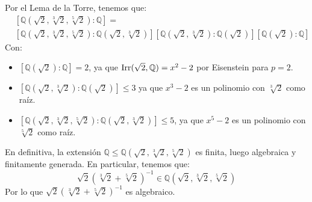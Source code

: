 \begin{ejercicio}
\begin{itemize}
            Por el Lema de la Torre, tenemos que:
            \begin{align*}
                &\left[\mathbb{Q}\left(\sqrt{2},\sqrt[3]{2},\sqrt[5]{2}\right):\mathbb{Q}\right] =
             \\ &\left[\mathbb{Q}\left(\sqrt{2},\sqrt[3]{2},\sqrt[5]{2}\right):\mathbb{Q}\left(\sqrt{2},\sqrt[3]{2}\right)\right] \left[\mathbb{Q}\left(\sqrt{2},\sqrt[3]{2}\right):\mathbb{Q}(\sqrt{2})\right] \left[\mathbb{Q}\left(\sqrt{2}\right):\mathbb{Q}\right]
            \end{align*}
            Con:
            \begin{itemize}
                \item $\left[\mathbb{Q}\left(\sqrt{2}\right):\mathbb{Q}\right] = 2$, ya que $\operatorname{Irr}(\sqrt{2},\mathbb{Q}) = x^2-2$ por Eisenstein para $p=2$.
                \item $\left[\mathbb{Q}\left(\sqrt{2},\sqrt[3]{2}\right):\mathbb{Q}\left(\sqrt{2}\right)\right]\leq 3$ ya que $x^3-2$ es un polinomio con $\sqrt[3]{2}$ como raíz.
                \item $\left[\mathbb{Q}\left(\sqrt{2},\sqrt[3]{2},\sqrt[5]{2}\right):\mathbb{Q}\left(\sqrt{2},\sqrt[3]{2}\right)\right] \leq 5$, ya que $x^5-2$ es un polinomio con $\sqrt[5]{2}$ como raíz.
            \end{itemize}
            En definitiva, la extensión $\mathbb{Q}\leq \mathbb{Q}\left(\sqrt{2},\sqrt[3]{2},\sqrt[5]{2}\right)$ es finita, luego algebraica y finitamente generada. En particular, tenemos que:
            \begin{equation*}
                \sqrt{2}{(\sqrt[3]{2}+\sqrt[5]{2})}^{-1} \in \mathbb{Q}\left(\sqrt{2},\sqrt[3]{2},\sqrt[5]{2}\right)
            \end{equation*}
            Por lo que $\sqrt{2}{(\sqrt[3]{2}+\sqrt[5]{2})}^{-1}$ es algebraico.
    \end{itemize}
\end{ejercicio}

